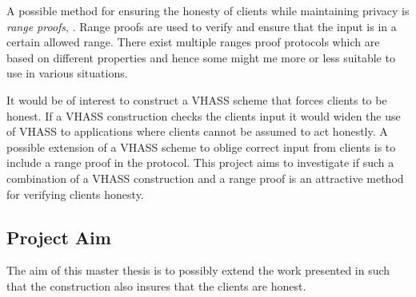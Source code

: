 \documentclass[12pt,a4paper]{article}
\begin{document}
A possible method for ensuring the honesty of clients while maintaining privacy is \textit{range proofs}, \cite{RANGE} \cite{DRYNX}. Range proofs are used to verify and ensure that the input is in a certain allowed range. There exist multiple ranges proof protocols which are based on different properties and hence some might me more or less suitable to use in various situations. 

It would be of interest to construct a VHASS scheme that forces clients to be honest. If a VHASS construction checks the clients input it would widen the use of VHASS to applications where clients cannot be assumed to act honestly. A possible extension of a VHASS scheme to oblige correct input from clients is to include a range proof in the protocol. This project aims to investigate if such a combination of a VHASS construction and a range proof is an attractive method for verifying clients honesty.  

\subsection{Project Aim}

The aim of this master thesis is to possibly extend the work presented in \cite{Georgia} such that the construction also insures that the clients are honest. 
\end{document}
